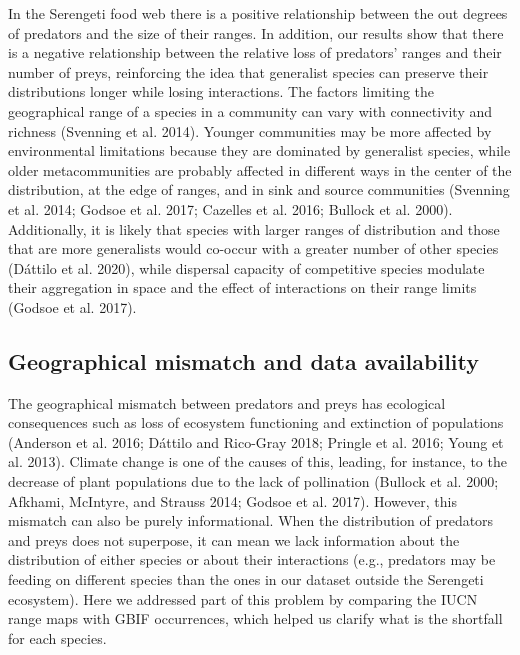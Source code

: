 \documentclass[10pt,oneside]{article}
\begin{document}
In the Serengeti food web there is a positive relationship between the
out degrees of predators and the size of their ranges. In addition, our
results show that there is a negative relationship between the relative
loss of predators' ranges and their number of preys, reinforcing the
idea that generalist species can preserve their distributions longer
while losing interactions. The factors limiting the geographical range
of a species in a community can vary with connectivity and richness
(Svenning et al. 2014). Younger communities may be more affected by
environmental limitations because they are dominated by generalist
species, while older metacommunities are probably affected in different
ways in the center of the distribution, at the edge of ranges, and in
sink and source communities (Svenning et al. 2014; Godsoe et al. 2017;
Cazelles et al. 2016; Bullock et al. 2000). Additionally, it is likely
that species with larger ranges of distribution and those that are more
generalists would co-occur with a greater number of other species
(Dáttilo et al. 2020), while dispersal capacity of competitive species
modulate their aggregation in space and the effect of interactions on
their range limits (Godsoe et al. 2017).

\hypertarget{geographical-mismatch-and-data-availability}{%
\subsection{Geographical mismatch and data
availability}\label{geographical-mismatch-and-data-availability}}

The geographical mismatch between predators and preys has ecological
consequences such as loss of ecosystem functioning and extinction of
populations (Anderson et al. 2016; Dáttilo and Rico-Gray 2018; Pringle
et al. 2016; Young et al. 2013). Climate change is one of the causes of
this, leading, for instance, to the decrease of plant populations due to
the lack of pollination (Bullock et al. 2000; Afkhami, McIntyre, and
Strauss 2014; Godsoe et al. 2017). However, this mismatch can also be
purely informational. When the distribution of predators and preys does
not superpose, it can mean we lack information about the distribution of
either species or about their interactions (e.g., predators may be
feeding on different species than the ones in our dataset outside the
Serengeti ecosystem). Here we addressed part of this problem by
comparing the IUCN range maps with GBIF occurrences, which helped us
clarify what is the shortfall for each species.
\end{document}
